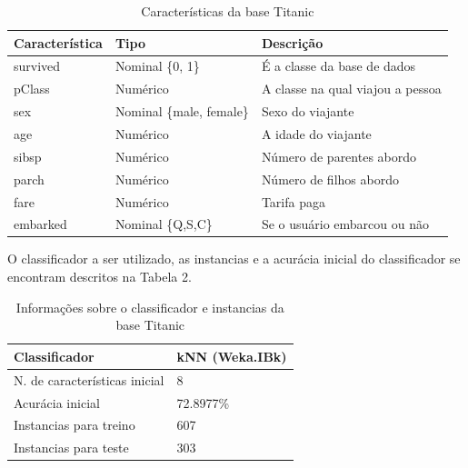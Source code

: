 \begin{table}[H]
\centering
\caption{Características da base Titanic}
\label{my-label}
\begin{tabular}{|l|l|l|}
\hline
\textbf{Característica} & \textbf{Tipo}            & \textbf{Descrição}\\ \hline
survived                & Nominal \{0, 1\}         & É a classe da base de dados\\ \hline
pClass                  & Numérico                 & A classe na qual viajou a pessoa\\ \hline
sex                     & Nominal \{male, female\} & Sexo do viajante\\ \hline
age                     & Numérico                 & A idade do viajante\\ \hline
sibsp                   & Numérico                 & Número de parentes abordo\\ \hline
parch                   & Numérico                 & Número de filhos abordo\\ \hline
fare                    & Numérico                 & Tarifa paga\\ \hline
embarked                & Nominal \{Q,S,C\}        & Se o usuário embarcou ou não\\ \hline
\end{tabular}
\end{table}

O classificador a ser utilizado, as instancias e a acurácia inicial do classificador se encontram descritos na Tabela 2.

\begin{table}[H]
\centering
\caption{Informações sobre o classificador e instancias da base Titanic}
\label{my-label}
\begin{tabular}{|l|l|}
\hline
\textbf{Classificador}        & \multicolumn{1}{c|}{\textbf{kNN (Weka.IBk)}} \\ \hline
N. de características inicial & 8                                            \\ \hline
Acurácia inicial        & 72.8977\%                                   \\ \hline
Instancias para treino        & 607                                          \\ \hline
Instancias para teste         & 303                                           \\ \hline
\end{tabular}
\end{table}

